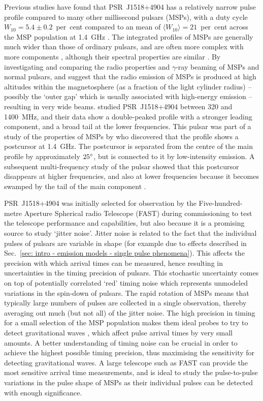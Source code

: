 Previous studies have found that PSR~J1518+4904 has a relatively narrow pulse profile compared to many other millisecond pulsars (MSPs), with a duty cycle $W_{10} = 5.4\pm0.2$~per~cent compared to an mean of $\langle W_{10} \rangle= 21$~per~cent across the MSP population  at 1.4~GHz \citep{KXL+1998}. The integrated profiles of MSPs are generally much wider than those of ordinary pulsars, and are often more complex with more components \citep[e.g.][]{YMS+2011}, although their spectral properties are similar \citep{TBMS1998, KXL+1998, KLL+1999}. By investigating and comparing the radio properties and $\gamma$-ray beaming of MSPs and normal pulsars, \citet{Mxxx2005} and \citet{RMHx2010} suggest that the radio emission of MSPs is produced at high altitudes within the magnetosphere (as a fraction of the light cylinder radius) -- possibly the `outer gap' which is usually associated with high-energy emission \citep[e.g.][]{CZxx1998} -- resulting in very wide beams. \citet{NSTx1996} studied PSR~J1518+4904 between 320 and 1400~MHz, and their data show a double-peaked profile with a stronger leading component, and a broad tail at the lower frequencies. This pulsar was part of a study of the properties of MSPs by \citet{KXL+1998} who discovered that the profile shows a postcursor at 1.4~GHz. The postcursor is separated from the centre of the main profile by approximately $25^\circ$, but is connected to it by low-intensity emission. A subsequent multi-frequency study of the pulsar \citep{KLL+1999} showed that this postcursor disappears at higher frequencies, and also at lower frequencies because it becomes swamped by the tail of the main component \citep{NSTx1996,STCx1999}.


PSR~J1518+4904 was initially selected for observation by the Five-hundred-metre Aperture Spherical radio Telescope (FAST) during commissioning to test the telescope performance and capabilities, but also because it is a promising source to study `jitter noise'. Jitter noise is related to the fact that the individual pulses of pulsars are variable in shape (for example due to effects described in Sec.~\ref{sec: intro - emission models - single pulse phenomena}). This affects the precision with which arrival times can be measured, hence resulting in uncertainties in the timing precision of pulsars. This stochastic uncertainty comes on top of potentially correlated `red' timing noise which represents unmodeled variations in the spin-down of pulsars. The rapid rotation of MSPs means that typically large numbers of pulses are collected in a single observation, thereby averaging out much (but not all) of the jitter noise. The high precision in timing for a small selection of the MSP population makes them ideal probes to try to detect gravitational waves \citep[e.g.][]{FBxx1990,MHB+2013}, which affect pulse arrival times by very small amounts. A better understanding of timing noise can be crucial in order to achieve the highest possible timing precision, thus maximising the sensitivity for detecting gravitational waves. A large telescope such as FAST can provide the most sensitive arrival time measurements, and is ideal to study the pulse-to-pulse variations in the pulse shape of MSPs as their individual pulses can be detected with enough significance.


